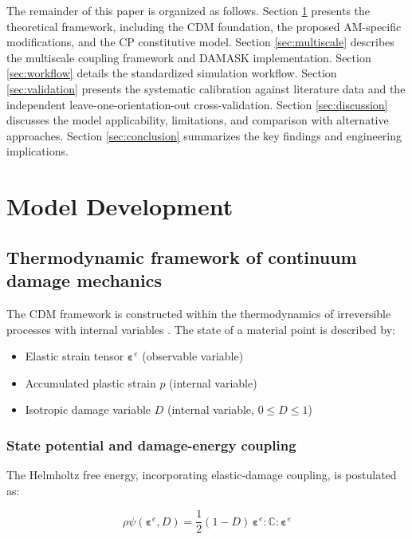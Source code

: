 \documentclass[twocolumn]{sagej}
\begin{document}
The remainder of this paper is organized as follows. Section \ref{sec:model} presents the theoretical framework, including the CDM foundation, the proposed AM-specific modifications, and the CP constitutive model. Section \ref{sec:multiscale} describes the multiscale coupling framework and DAMASK implementation. Section \ref{sec:workflow} details the standardized simulation workflow. Section \ref{sec:validation} presents the systematic calibration against literature data and the independent leave-one-orientation-out cross-validation. Section \ref{sec:discussion} discusses the model applicability, limitations, and comparison with alternative approaches. Section \ref{sec:conclusion} summarizes the key findings and engineering implications.

\section{Model Development}
\label{sec:model}

\subsection{Thermodynamic framework of continuum damage mechanics}

The CDM framework is constructed within the thermodynamics of irreversible processes with internal variables \cite{lemaitre1992course}. The state of a material point is described by:

\begin{itemize}
    \item Elastic strain tensor $\boldsymbol{\varepsilon}^e$ (observable variable)
    \item Accumulated plastic strain $p$ (internal variable)
    \item Isotropic damage variable $D$ (internal variable, $0 \le D \le 1$)
\end{itemize}

\subsubsection{State potential and damage-energy coupling}

The Helmholtz free energy, incorporating elastic-damage coupling, is postulated as:

\begin{equation}
\rho\psi(\boldsymbol{\varepsilon}^e, D) = \frac{1}{2}(1-D) \, \boldsymbol{\varepsilon}^e : \mathbb{C} : \boldsymbol{\varepsilon}^e
\label{eq:free_energy}
\end{equation}
\end{document}
